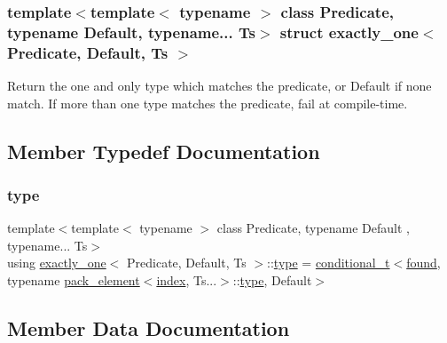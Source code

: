 \subsubsection*{template$<$template$<$ typename $>$ class Predicate, typename Default, typename... Ts$>$\newline
struct exactly\+\_\+one$<$ Predicate, Default, Ts $>$}

Return the one and only type which matches the predicate, or Default if none match. If more than one type matches the predicate, fail at compile-\/time. 

\subsection{Member Typedef Documentation}
\mbox{\label{structexactly__one_ae80ab0a0e6f21d11a9a8b821cc2e352e}} 
\subsubsection{\texorpdfstring{type}{type}}
{\footnotesize\ttfamily template$<$template$<$ typename $>$ class Predicate, typename Default , typename... Ts$>$ \\
using \mbox{\hyperlink{structexactly__one}{exactly\+\_\+one}}$<$ Predicate, Default, Ts $>$\+::\mbox{\hyperlink{structexactly__one_ae80ab0a0e6f21d11a9a8b821cc2e352e}{type}} =  \mbox{\hyperlink{detail_2common_8h_acdb0eff728aec08ed6fff07d2885ea9d}{conditional\+\_\+t}}$<$\mbox{\hyperlink{structexactly__one_a2e88399d33d5e51e1b27f785259f408c}{found}}, typename \mbox{\hyperlink{structpack__element}{pack\+\_\+element}}$<$\mbox{\hyperlink{_s_d_l__opengl__glext_8h_a57f14e05b1900f16a2da82ade47d0c6d}{index}}, Ts...$>$\+::\mbox{\hyperlink{structexactly__one_ae80ab0a0e6f21d11a9a8b821cc2e352e}{type}}, Default$>$}



\subsection{Member Data Documentation}
\mbox{\label{structexactly__one_a2e88399d33d5e51e1b27f785259f408c}} 
